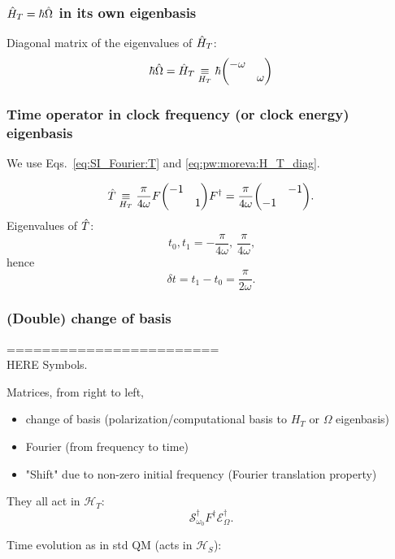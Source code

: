 \subsubsection*{$\hat{H}_T = \hbar\hat{\Omega}$ in its own eigenbasis}

Diagonal matrix of the eigenvalues of $\hat{H}_T$:
\begin{equation}\label{eq:pw:moreva:H_T_diag}
  \hbar\op{\Omega} = \op{H}_T \repr[H_T] \hbar\mqty(\dmat{-\omega, \omega})
\end{equation}

\subsubsection*{Time operator in clock frequency (or clock energy) eigenbasis}

We use Eqs.~\eqref{eq:SI_Fourier:T} and \eqref{eq:pw:moreva:H_T_diag}.

\begin{equation}
  \op{T} \repr[H_T] \frac{\pi}{4\omega} F \mqty(\dmat{-1, 1}) F^{\dagger}
  =
  \frac{\pi}{4\omega} \mqty(\admat{-1, -1})
  \text{.}
\end{equation}
%
Eigenvalues of $\hat{T}$:
$$
t_0, t_1 = - \frac{\pi}{4\omega}, \  \frac{\pi}{4\omega} \text{,}
$$
hence
$$
\delta{t} = t_1 - t_0 = \frac{\pi}{2\omega} \text{.}
$$


\subsubsection*{(Double) change of basis}
========================\\
HERE Symbols.

Matrices, from right to left,
\begin{itemize}
  \item change of basis (polarization/computational basis to $H_T$ or $\Omega$ eigenbasis)
  \item Fourier (from frequency to time)
  \item "Shift" due to non-zero initial frequency (Fourier translation property)
\end{itemize}
They all act in $\mathcal{H}_T$:
$$\mathcal{S}_{\omega_0}^{\dagger} F^{\dagger} \mathcal{E}_{\Omega}^{\dagger} .$$

Time evolution as in std QM (acts in $\mathcal{H}_S$):

